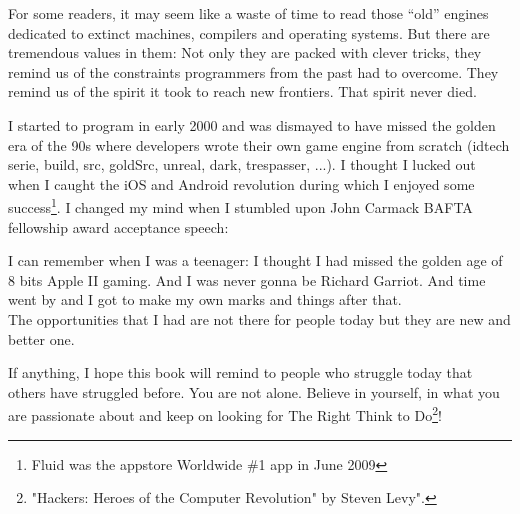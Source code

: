 \documentclass[book.tex]{subfiles}
\begin{document}
\bigskip

For some readers, it may seem like a waste of time to read those ``old'' engines dedicated to extinct machines, compilers and operating systems. But there are tremendous values in them: Not only they are packed with clever tricks, they remind us of the constraints programmers from the past had to overcome. They remind us of the spirit it took to reach new frontiers. That spirit never died.\\
\par
{} 
I started to program in early 2000 and was dismayed to have missed the golden era of the 90s where developers wrote their own game engine from scratch (idtech serie, build, src, goldSrc, unreal, dark, trespasser, ...). I thought I lucked out when I caught the iOS and Android revolution during which I enjoyed some success\footnote{Fluid was the appstore Worldwide \#1 app in June 2009}. I changed my mind when I stumbled upon John Carmack BAFTA fellowship award acceptance speech:\\
\par
 \begin{fancyquotes}
I can remember when I was a teenager: I thought I had missed the golden age of 8 bits Apple II gaming. And I was never gonna be Richard Garriot. And time went by and I got to make
    my own marks and things after that.\\
    
    The opportunities that I had are not there for people today but they are new and better one.
 \bigskip
 \end{fancyquotes}
\par
 If anything, I hope this book will remind to people who struggle today that others have struggled before. You are not alone. Believe in yourself, in what you are passionate about and keep on looking for The Right Think to Do\footnote{"Hackers: Heroes of the Computer Revolution" by Steven Levy".}!\\



\end{document}
